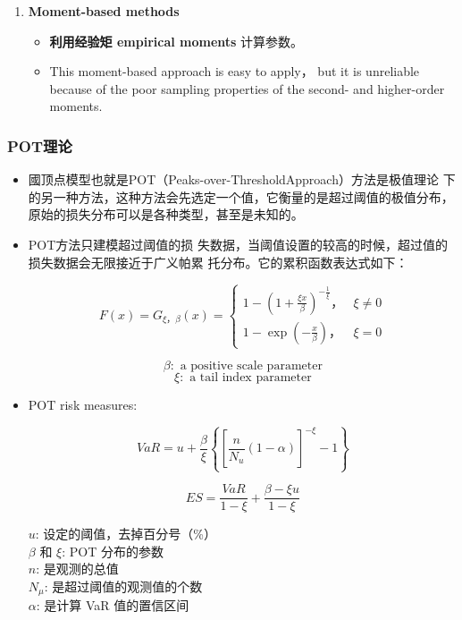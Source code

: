 \begin{itemize}
\begin{enumerate}[label=\Alph*.]
    \item \textbf{Moment-based methods}
    \begin{itemize} 
        \item \textbf{利用经验矩 empirical moments} 计算参数。
        \item This moment-based approach is easy to apply， but it is unreliable because of the poor sampling properties of the second- and higher-order moments.     \end{itemize}

\end{enumerate}


\end{itemize}



\subsubsection{POT理论}

\begin{itemize}


    \item 國顶点模型也就是POT（Peaks-over-ThresholdApproach）方法是极值理论
下的另一种方法，这种方法会先选定一个值，它衡量的是超过阈值的极值分布，
原始的损失分布可以是各种类型，甚至是未知的。

\item POT方法只建模超过阈值的损
失数据，当阈值设置的较高的时候，超过值的损失数据会无限接近于广义帕累
托分布。它的累积函数表达式如下：

\[
F(x) =G_{\xi， \beta}(x) =
\begin{cases}
1 - \left(1 + \frac{\xi x}{\beta}\right)^{-\frac{1}{\xi}}， & \xi \neq 0 \\
1 - \exp\left(-\frac{x}{\beta}\right)， & \xi = 0
\end{cases}
\]


\[
\beta: \text{ a positive scale parameter}
\]
\[
\xi: \text{ a tail index parameter}
\]


\item POT risk measures: 

\[
VaR = u + \frac{\beta}{\xi} \left\{ \left[ \frac{n}{N_u} (1 - \alpha) \right]^{-\xi} - 1 \right\}
\]

\[
ES = \frac{VaR}{1 - \xi} + \frac{\beta - \xi u}{1 - \xi}
\]

    \( u \): 设定的阈值，去掉百分号（\%） \\
    \( \beta \) 和 \( \xi \): POT 分布的参数 \\
    \( n \): 是观测的总值 \\
    \( N_\mu \): 是超过阈值的观测值的个数 \\
    \( \alpha \): 是计算 VaR 值的置信区间

\end{itemize}

